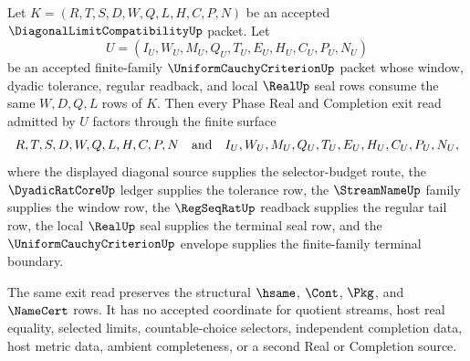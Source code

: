\begin{theorem}
\label{thm:diagonal-limit-selector-budget-uniform-real-exit}
Let $K=(R,T,S,D,W,Q,L,H,C,P,N)$ be an accepted $\DiagonalLimitCompatibilityUp$ packet. Let
$$
U=(I_U,W_U,M_U,Q_U,T_U,E_U,H_U,C_U,P_U,N_U)
$$
be an accepted finite-family $\UniformCauchyCriterionUp$ packet whose window, dyadic tolerance, regular readback, and local $\RealUp$ seal rows consume the same $W,D,Q,L$ rows of $K$. Then every Phase Real and Completion exit read admitted by $U$ factors through the finite surface
$$
R,T,S,D,W,Q,L,H,C,P,N
\quad\hbox{and}\quad
I_U,W_U,M_U,Q_U,T_U,E_U,H_U,C_U,P_U,N_U,
$$
where the displayed diagonal source supplies the selector-budget route, the $\DyadicRatCoreUp$ ledger supplies the tolerance row, the $\StreamNameUp$ family supplies the window row, the $\RegSeqRatUp$ readback supplies the regular tail row, the local $\RealUp$ seal supplies the terminal seal row, and the $\UniformCauchyCriterionUp$ envelope supplies the finite-family terminal boundary.

The same exit read preserves the structural $\hsame$, $\Cont$, $\Pkg$, and $\NameCert$ rows. It has no accepted coordinate for quotient streams, host real equality, selected limits, countable-choice selectors, independent completion data, host metric data, ambient completeness, or a second Real or Completion source.
\end{theorem}
